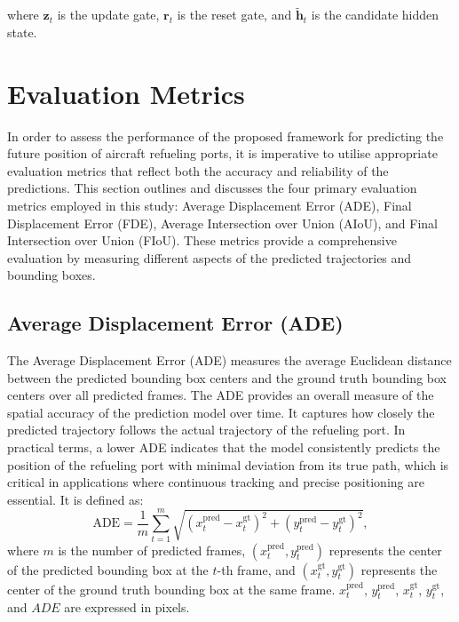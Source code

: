 \documentclass[12pt,oneside]{book} %
\begin{document}
where $\mathbf{z}_t$ is the update gate, $\mathbf{r}_t$ is the reset gate, and
$\mathbf{\tilde{h}}_t$ is the candidate hidden state.

\newpage
\section{Evaluation Metrics}
In order to assess the performance of the proposed framework for predicting the
future position of aircraft refueling ports, it is imperative to utilise
appropriate evaluation metrics that reflect both the accuracy and reliability
of the predictions. This section outlines and discusses the four primary
evaluation metrics employed in this study: Average Displacement Error (ADE),
Final Displacement Error (FDE), Average Intersection over Union (AIoU), and
Final Intersection over Union (FIoU). These metrics provide a comprehensive
evaluation by measuring different aspects of the predicted trajectories and
bounding boxes.

\subsection*{Average Displacement Error (ADE)}
\noindent The Average Displacement Error (ADE) measures the average Euclidean distance
between the predicted bounding box centers and the ground truth bounding box
centers over all predicted frames. The ADE provides an overall measure of the
spatial accuracy of the prediction model over time. It captures how closely the
predicted trajectory follows the actual trajectory of the refueling port. In
practical terms, a lower ADE indicates that the model consistently predicts the
position of the refueling port with minimal deviation from its true path, which
is critical in applications where continuous tracking and precise positioning
are essential. It is defined as:
\begin{equation}
    \text{ADE} = \frac{1}{m} \sum_{t=1}^{m} \sqrt{(x_t^{\text{pred}} - x_t^{\text{gt}})^2 + (y_t^{\text{pred}} - y_t^{\text{gt}})^2},
\end{equation}
where \(m\) is the number of predicted frames, \((x_t^{\text{pred}}, y_t^{\text{pred}})\) represents the center of the predicted bounding box at the \(t\)-th frame, and \((x_t^{\text{gt}}, y_t^{\text{gt}})\) represents the center of the ground truth bounding box at the same frame. \(x_t^{\text{pred}}\), \(y_t^{\text{pred}}\), \(x_t^{\text{gt}}\), \(y_t^{\text{gt}}\), and \(ADE\) are expressed in pixels.
\end{document}
